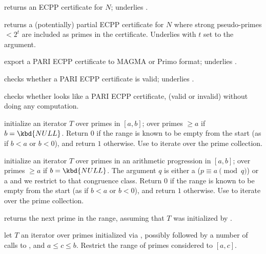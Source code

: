  returns an ECPP certificate for  $N$;
underlies .

 returns a (potentially)
partial ECPP certificate for  $N$ where strong pseudo-primes $< 2^t$
are included as primes in the certificate. Underlies  with
$t$ set to the  argument.

 export a PARI ECPP certificate to
MAGMA or Primo format; underlies .

 checks whether a PARI ECPP certificate
is valid; underlies .

 checks whether  looks
like a PARI ECPP certificate, (valid or invalid) without doing any computation.


 initialize an
iterator $T$ over primes in $[a,b]$; over primes $\geq a$ if $b =
\kbd{NULL}$. Return $0$ if the range is known to be empty from the start
(as if $b < a$ or $b < 0$), and return $1$ otherwise. Use 
to iterate over the prime collection.

 initialize an
iterator $T$ over primes in an arithmetic progression in $[a,b]$;
over primes $\geq a$ if $b = \kbd{NULL}$. The argument $q$ is either a
 ($p \equiv a \pmod{q}$) or a  
and we restrict to that congruence class. Return $0$ if the range is known to
be empty from the start (as if $b < a$ or $b < 0$), and return $1$ otherwise.
Use  to iterate over the prime collection.

 returns the next prime in the range,
assuming that $T$ was initialized by .



 let $T$ an iterator
over primes initialized via , possibly
followed by a number of calls to , and $a \leq c \leq
b$. Restrict the range of primes considered to $[a,c]$.

